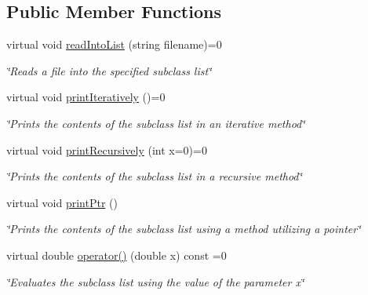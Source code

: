 \subsection*{Public Member Functions}
\begin{DoxyCompactItemize}
\item 
virtual void \hyperlink{classTermList_a42a681a3ccc704e4a4086fcd34a01808}{read\-Into\-List} (string filename)=0
\begin{DoxyCompactList}\small\item\em \char`\"{}\-Reads a file into the specified subclass list\char`\"{} \end{DoxyCompactList}\item 
\hypertarget{classTermList_a9db7ca8d8820f11e70572e09618f75ec}{virtual void \hyperlink{classTermList_a9db7ca8d8820f11e70572e09618f75ec}{print\-Iteratively} ()=0}\label{classTermList_a9db7ca8d8820f11e70572e09618f75ec}

\begin{DoxyCompactList}\small\item\em \char`\"{}\-Prints the contents of the subclass list in an iterative method\char`\"{} \end{DoxyCompactList}\item 
virtual void \hyperlink{classTermList_af315579d71158e31fafa2905b20e1fa6}{print\-Recursively} (int x=0)=0
\begin{DoxyCompactList}\small\item\em \char`\"{}\-Prints the contents of the subclass list in a recursive method\char`\"{} \end{DoxyCompactList}\item 
\hypertarget{classTermList_ab9068da62dc3bc346e90b782ec31976b}{virtual void \hyperlink{classTermList_ab9068da62dc3bc346e90b782ec31976b}{print\-Ptr} ()}\label{classTermList_ab9068da62dc3bc346e90b782ec31976b}

\begin{DoxyCompactList}\small\item\em \char`\"{}\-Prints the contents of the subclass list using a method utilizing a pointer\char`\"{} \end{DoxyCompactList}\item 
virtual double \hyperlink{classTermList_ad1600d9d577b619310f06e83e5e847ff}{operator()} (double x) const =0
\begin{DoxyCompactList}\small\item\em \char`\"{}\-Evaluates the subclass list using the value of the parameter x\char`\"{} \end{DoxyCompactList}\end{DoxyCompactItemize}


